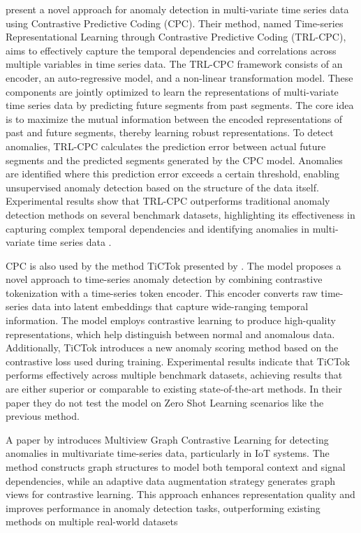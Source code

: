 %
 present a novel approach for anomaly detection in multi-variate time series data using Contrastive Predictive Coding (CPC). Their method, named Time-series Representational Learning through Contrastive Predictive Coding (TRL-CPC), aims to effectively capture the temporal dependencies and correlations across multiple variables in time series data.
The TRL-CPC framework consists of an encoder, an auto-regressive model, and a non-linear transformation model. These components are jointly optimized to learn the representations of multi-variate time series data by predicting future segments from past segments. The core idea is to maximize the mutual information between the encoded representations of past and future segments, thereby learning robust representations.
To detect anomalies, TRL-CPC calculates the prediction error between actual future segments and the predicted segments generated by the CPC model. Anomalies are identified where this prediction error exceeds a certain threshold, enabling unsupervised anomaly detection based on the structure of the data itself.
Experimental results show that TRL-CPC outperforms traditional anomaly detection methods on several benchmark datasets, highlighting its effectiveness in capturing complex temporal dependencies and identifying anomalies in multi-variate time series data .

CPC is also used by the method TiCTok presented by . The model proposes a novel approach to time-series anomaly detection by combining contrastive tokenization with a time-series token encoder. This encoder converts raw time-series data into latent embeddings that capture wide-ranging temporal information. The model employs contrastive learning to produce high-quality representations, which help distinguish between normal and anomalous data. Additionally, TiCTok introduces a new anomaly scoring method based on the contrastive loss used during training. Experimental results indicate that TiCTok performs effectively across multiple benchmark datasets, achieving results that are either superior or comparable to existing state-of-the-art methods. In their paper they do not test the model on Zero Shot Learning scenarios like the previous method.

A paper by  introduces Multiview Graph Contrastive Learning for detecting anomalies in multivariate time-series data, particularly in IoT systems. The method constructs graph structures to model both temporal context and signal dependencies, while an adaptive data augmentation strategy generates graph views for contrastive learning. This approach enhances representation quality and improves performance in anomaly detection tasks, outperforming existing methods on multiple real-world datasets

